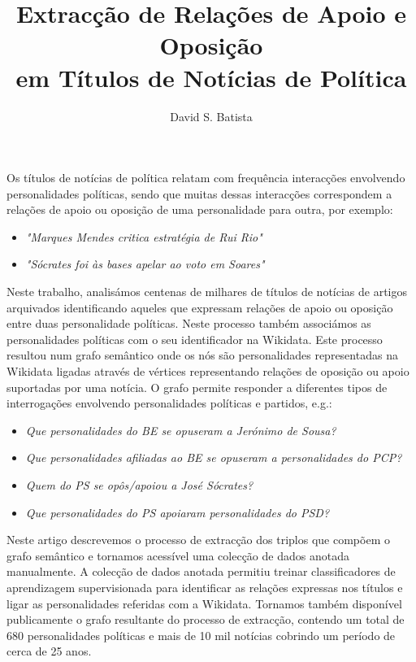 \documentclass[a4paper, twocolumn, 11pt, twoside]{article}
\title{Extracção de Relações de Apoio e Oposição \\em Títulos de Notícias de Política}
\author{
  David S. Batista \\
  \email{dsbatista@gmail.com} 
}
\begin{document}
\maketitle

\begin{resumo}
Os títulos de notícias de política relatam com frequência interacções envolvendo personalidades políticas, sendo que muitas dessas interacções correspondem a relações de apoio ou oposição de uma personalidade para outra, por exemplo:

\begin{itemize}
\item{\textit{"Marques Mendes critica estratégia de Rui Rio"}}
\item{\textit{"Sócrates foi às bases apelar ao voto em Soares"}}
\end{itemize}

Neste trabalho, analisámos centenas de milhares de títulos de notícias de artigos arquivados identificando aqueles que expressam relações de apoio ou oposição entre duas personalidade políticas. Neste processo também associámos as personalidades políticas com o seu identificador na Wikidata. Este processo resultou num grafo semântico onde os nós são personalidades representadas na Wikidata ligadas através de vértices representando relações de oposição ou apoio suportadas por uma notícia. O grafo permite responder a diferentes tipos de interrogações envolvendo personalidades políticas e partidos, e.g.:

\begin{itemize}
\item{\textit{Que personalidades do BE se opuseram a Jerónimo de Sousa?}}
\item{\textit{Que personalidades afiliadas ao BE se opuseram a personalidades do PCP?}}
\item{\textit{Quem do PS se opôs/apoiou a José Sócrates?}}
\item{\textit{Que personalidades do PS apoiaram personalidades do PSD?}}
\end{itemize}

Neste artigo descrevemos o processo de extracção dos triplos que compõem o grafo semântico e tornamos acessível uma colecção de dados anotada manualmente. A colecção de dados anotada permitiu treinar classificadores de aprendizagem supervisionada para identificar as relações expressas nos títulos e ligar as personalidades referidas com a Wikidata. Tornamos também disponível publicamente o grafo resultante do processo de extracção, contendo um total de 680 personalidades políticas e mais de 10 mil notícias cobrindo um período de cerca de 25 anos.
\end{resumo}
\end{document}
